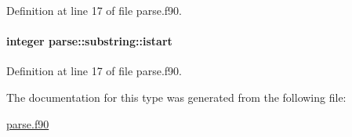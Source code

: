 Definition at line 17 of file parse.\-f90.

\hypertarget{structparse_1_1substring_a46fe507cebb0c609e8af9b5fd0a4d711}{
\paragraph[{istart}]{\setlength{\rightskip}{0pt plus 5cm}integer parse\-::substring\-::istart}}\label{structparse_1_1substring_a46fe507cebb0c609e8af9b5fd0a4d711}


Definition at line 17 of file parse.\-f90.



The documentation for this type was generated from the following file\-:\begin{DoxyCompactItemize}
\item 
\hyperlink{parse_8f90}{parse.\-f90}\end{DoxyCompactItemize}
